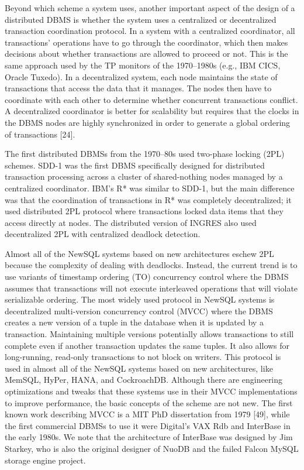 \documentclass[a4paper,12pt,notitlepage,twoside,openright]{article}
\begin{document}
Beyond which scheme a system uses, another important aspect of the
design of a distributed DBMS is whether the system uses a centralized or
decentralized transaction coordination protocol. In a system with a
centralized coordinator, all transactions' operations have to go through
the coordinator, which then makes decisions about whether transactions
are allowed to proceed or not. This is the same approach used by the TP
monitors of the 1970--1980s (e.g., IBM CICS, Oracle Tuxedo). In a
decentralized system, each node maintains the state of transactions that
access the data that it manages. The nodes then have to coordinate with
each other to determine whether concurrent transactions conflict. A
decentralized coordinator is better for scalability but requires that
the clocks in the DBMS nodes are highly synchronized in order to
generate a global ordering of transactions {[}24{]}.

The first distributed DBMSs from the 1970--80s used two-phase locking
(2PL) schemes. SDD-1 was the first DBMS specifically designed for
distributed transaction processing across a cluster of shared-nothing
nodes managed by a centralized coordinator. IBM's R* was similar to
SDD-1, but the main difference was that the coordination of transactions
in R* was completely decentralized; it used distributed 2PL protocol
where transactions locked data items that they access directly at nodes.
The distributed version of INGRES also used decentralized 2PL with
centralized deadlock detection.

Almost all of the NewSQL systems based on new architectures eschew 2PL
because the complexity of dealing with deadlocks. Instead, the current
trend is to use variants of timestamp ordering (TO) concurrency control
where the DBMS assumes that transactions will not execute interleaved
operations that will violate serializable ordering. The most widely used
protocol in NewSQL systems is decentralized multi-version concurrency
control (MVCC) where the DBMS creates a new version of a tuple in the
database when it is updated by a transaction. Maintaining multiple
versions potentially allows transactions to still complete even if
another transaction updates the same tuples. It also allows for
long-running, read-only transactions to not block on writers. This
protocol is used in almost all of the NewSQL systems based on new
architectures, like MemSQL, HyPer, HANA, and CockroachDB. Although there
are engineering optimizations and tweaks that these systems use in their
MVCC implementations to improve performance, the basic concepts of the
scheme are not new. The first known work describing MVCC is a MIT PhD
dissertation from 1979 {[}49{]}, while the first commercial DBMSs to use
it were Digital's VAX Rdb and InterBase in the early 1980s. We note that
the architecture of InterBase was designed by Jim Starkey, who is also
the original designer of NuoDB and the failed Falcon MySQL storage
engine project.
\end{document}
